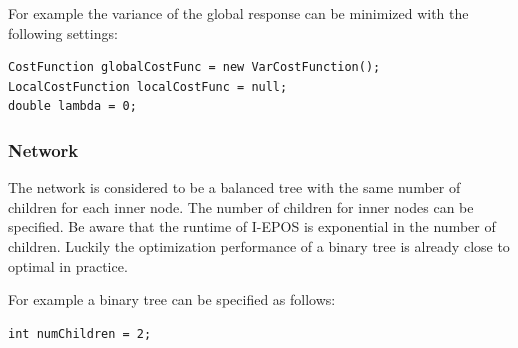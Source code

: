 \documentclass[11pt]{article} %
\begin{document}
\noindent For example the variance of the global response can be minimized with the following settings:
\begin{verbatim}
CostFunction globalCostFunc = new VarCostFunction();
LocalCostFunction localCostFunc = null;
double lambda = 0;
\end{verbatim}

\subsubsection*{Network}
The network is considered to be a balanced tree with the same number of children for each inner node. The number of children for inner nodes can be specified. Be aware that the runtime of I-EPOS is exponential in the number of children. Luckily the optimization performance of a binary tree is already close to optimal in practice.

For example a binary tree can be specified as follows:
\begin{verbatim}
int numChildren = 2;
\end{verbatim}
\end{document}
